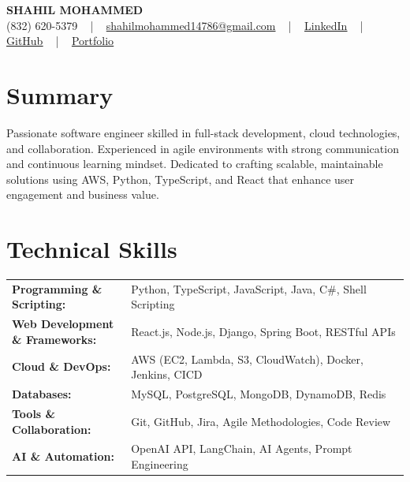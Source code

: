 \documentclass[letterpaper,11pt]{article}
\begin{document}
\begin{center}
    {\fontsize{14pt}{12pt}\selectfont \textbf{\MakeUppercase{Shahil Mohammed}}}\\ \vspace{2pt}
    \fontsize{10pt}{12pt}\selectfont (832) 620-5379 ~ | ~ \href{mailto:shahilmohammed14786@gmail.com}{shahilmohammed14786@gmail.com} ~ | ~  
    \href{https://www.linkedin.com/in/shahil-mohammed-9652931a1/}{\color{blue}\underline{LinkedIn}}  ~ | ~ 
    \href{https://github.com/freakbeast14}{\color{blue}\underline{GitHub}} ~ | ~ 
    \href{https://shahil-mohammed.netlify.app/}{\color{blue}\underline{Portfolio}}
    \vspace{-8pt}
\end{center}

\section{Summary}
\fontsize{9pt}{10pt}\selectfont
Passionate software engineer skilled in full-stack development, cloud technologies, and collaboration. Experienced in agile environments with strong communication and continuous learning mindset. Dedicated to crafting scalable, maintainable solutions using AWS, Python, TypeScript, and React that enhance user engagement and business value.
 \vspace{-5pt}
 
\section{Technical Skills}
        \vspace{-14pt}
        \begin{table}[h]
            \fontsize{9pt}{10pt}\selectfont
            \begin{tabular}{p{0.3\linewidth} p{0.7\linewidth}}
                \textbf{Programming \& Scripting:} & Python, TypeScript, JavaScript, Java, C\#, Shell Scripting \\
                \textbf{Web Development \& Frameworks:} & React.js, Node.js, Django, Spring Boot, RESTful APIs \\
                \textbf{Cloud \& DevOps:} & AWS (EC2, Lambda, S3, CloudWatch), Docker, Jenkins, CICD \\
                \textbf{Databases:} & MySQL, PostgreSQL, MongoDB, DynamoDB, Redis \\
                \textbf{Tools \& Collaboration:} & Git, GitHub, Jira, Agile Methodologies, Code Review \\
                \textbf{AI \& Automation:} & OpenAI API, LangChain, AI Agents, Prompt Engineering \\
            \end{tabular}
        \end{table}
 \vspace{-15pt}
 
\end{document}
